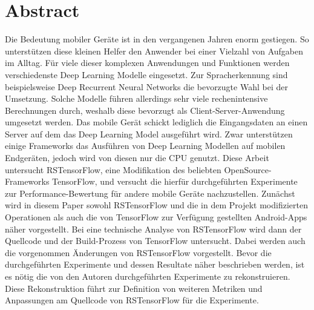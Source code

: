\section{Abstract}
\label{sec:abstract}
Die Bedeutung mobiler Geräte ist in den vergangenen Jahren enorm gestiegen. So unterstützen diese kleinen Helfer den Anwender bei einer Vielzahl von Aufgaben im Alltag. Für viele dieser komplexen Anwendungen und Funktionen werden verschiedenste Deep Learning Modelle eingesetzt. Zur Spracherkennung sind beispielsweise Deep Recurrent Neural Networks die bevorzugte Wahl bei der Umsetzung. Solche Modelle führen allerdings sehr viele rechenintensive Berechnungen durch, weshalb diese bevorzugt als Client-Server-Anwendung umgesetzt werden. Das mobile Gerät schickt lediglich die Eingangsdaten an einen Server auf dem das Deep Learning Model ausgeführt wird. Zwar unterstützen einige Frameworks das Ausführen von Deep Learning Modellen auf mobilen Endgeräten, jedoch wird von diesen nur die CPU genutzt. 
Diese Arbeit untersucht RSTensorFlow, eine Modifikation des beliebten OpenSource-Frameworks TensorFlow, und versucht die hierfür durchgeführten Experimente zur Performance-Bewertung für andere mobile Geräte nachzustellen. Zunächst wird in diesem Paper sowohl RSTensorFlow und die in dem Projekt modifizierten Operationen als auch die von TensorFlow zur Verfügung gestellten Android-Apps näher vorgestellt. Bei eine technische Analyse von RSTensorFlow wird dann der Quellcode und der Build-Prozess von TensorFlow untersucht. Dabei werden auch die vorgenommen Änderungen von RSTensorFlow vorgestellt. Bevor die durchgeführten Experimente und dessen Resultate näher beschrieben werden, ist es nötig die von den Autoren durchgeführten Experimente zu rekonstruieren. Diese Rekonstruktion führt zur Definition von weiteren Metriken und Anpassungen am Quellcode von RSTensorFlow für die Experimente. 